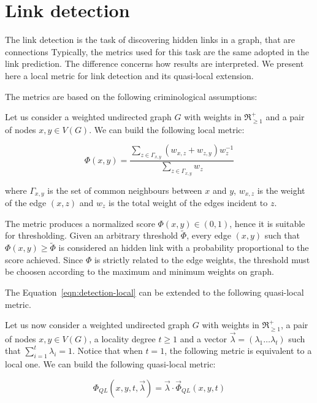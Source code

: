 \section{Link detection}
\label{sec:link-detection}

The link detection is the task of discovering hidden links in a graph, that are connections 
Typically, the metrics used for this task are the same adopted in the link prediction. 
The difference concerns how results are interpreted.
We present here a local metric for link detection and its quasi-local extension.

The metrics are based on the following criminological assumptions:

Let us consider a weighted undirected graph $G$ with weights in $\Re_{\geq1}^{+}$ and a pair of nodes $x,y\in V(G)$.
We can build the following local metric:


\begin{equation}
\label{eqn:detection-local}
\Phi(x,y)=
\frac{\sum\limits_{z\in\Gamma_{x,y}}(w_{x,z}+w_{z,y})w_{z}^{-1}}
{\sum\limits_{z\in\Gamma_{x,y}}w_{z}}
\end{equation}

where 
$\Gamma_{x,y}$ is the set of common neighbours between $x$ and $y$,
$w_{x,z}$ is the weight of the edge $(x,z)$ and
$w_{z}$ is the total weight of the edges incident to $z$.

The metric produces a normalized score $\Phi(x,y)\in(0,1)$, hence it is suitable for thresholding.
Given an arbitrary threshold $\tilde{\Phi}$, every edge $(x,y)$ such that $\Phi(x,y)\geq\tilde{\Phi}$ is considered an hidden link with a probability proportional to the score achieved.
Since $\Phi$ is strictly related to the edge weights, the threshold must be choosen according to the maximum and minimum weights on graph.

The Equation~\ref{eqn:detection-local} can be extended to the following quasi-local metric.

Let us now consider a weighted undirected graph $G$ with weights in $\Re_{\geq1}^{+}$, a pair of nodes $x,y\in V(G)$, a locality degree $t\geq 1$ and a vector $\vec{\lambda}=(\lambda_{1}\ldots\lambda_{t})$ such that $\sum_{i=1}^{t}\lambda_{i}=1$. Notice that when $t=1$, the following metric is equivalent to a local one.
We can build the following quasi-local metric:

\begin{equation}
\label{eqn:detection-quasi-local-1}
\Phi_{QL}(x,y,t,\vec{\lambda})=\vec{\lambda}\cdot\vec{\Phi}_{QL}(x,y,t)
\end{equation}

